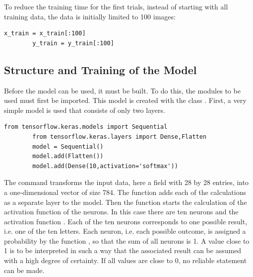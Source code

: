 To reduce the training time for the first trials, instead of starting with all training data, the data is initially limited to 100 images:

\medskip

\begin{code}
    \begin{lstlisting}[numbers=none]
        x_train = x_train[:100]
        y_train = y_train[:100]
    \end{lstlisting}
    
    \caption{Limitation of the fields to 100 elements}
\end{code}

\subsection{Structure and Training of the Model}

Before the model can be used, it must be built. To do this, the modules to be used must first be imported. This model is created with the class . First, a very simple model is used that consists of only two layers.

\medskip

\begin{code}
    \begin{lstlisting}[numbers=none]
        from tensorflow.keras.models import Sequential
        from tensorflow.keras.layers import Dense,Flatten
        model = Sequential()
        model.add(Flatten())
        model.add(Dense(10,activation='softmax'))
    \end{lstlisting}
    
    \caption{Building a model with two layers}
\end{code}

\medskip

The command  transforms the input data, here a field with 28 by 28 entries, into a one-dimensional vector of size 784. The function  adds each of the calculations as a separate layer to the model. Then the function  starts the calculation of the activation function of the neurons. In this case there are ten neurons and the activation function . Each of the ten neurons corresponds to one possible result, i.e. one of the ten letters. Each neuron, i.e. each possible outcome, is assigned a probability by the function , so that the sum of all neurons is 1. A value close to 1 is to be interpreted in such a way that the associated result can be assumed with a high degree of certainty. If all values are close to 0, no reliable statement can be made.


